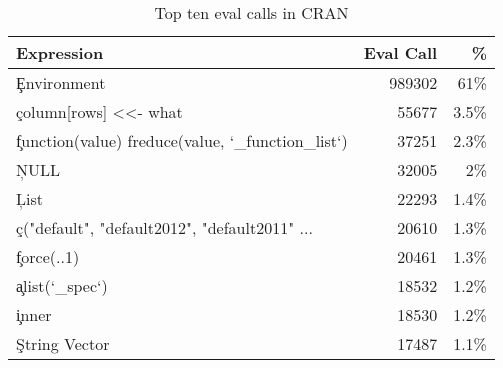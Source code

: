 \documentclass[USenglish,cleveref, autoref, thm-restate]{lipics-v2019}
\begin{document}
\begin{table}[!h]  \centering
\begin{tabular}{@{}l@{~}|@{~}r@{~}r@{}} \hline
Expression & Eval Call &  \% \\\hline
\c{Environment} &                                  989302   & 61\%\\
\c{column[rows] <<- what} &                        55677    & 3.5\%\\
\c{function(value) freduce(value, `_function_list`)} & 37251& 2.3\%\\
\c{NULL} &                         32005    & 2\%\\
\c{List} &                         22293    & 1.4\%\\
\c{c("default", "default2012", "default2011" ...}& 20610    & 1.3\%\\
\c{force(..1)}            &                        20461    & 1.3\%\\
\c{alist(`_spec`)}       &                         18532    & 1.2\%\\
\c{inner}               &                          18530    & 1.2\%\\
\c{String Vector}      &                           17487     & 1.1\%\\
\end{tabular}\caption{Top ten eval calls in CRAN} \label{C}
\end{table}
\end{document}
